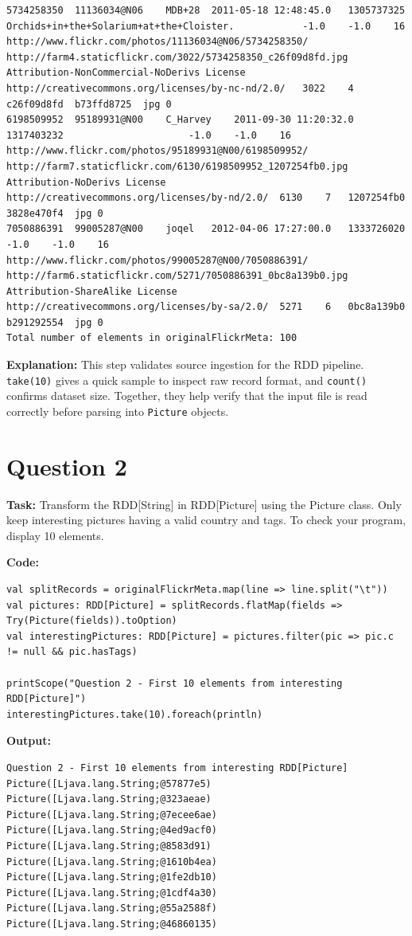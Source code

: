 \documentclass[11pt]{article}
\begin{document}
\begin{lstlisting}
5734258350	11136034@N06	MDB+28	2011-05-18 12:48:45.0	1305737325			Orchids+in+the+Solarium+at+the+Cloister.			-1.0	-1.0	16	http://www.flickr.com/photos/11136034@N06/5734258350/	http://farm4.staticflickr.com/3022/5734258350_c26f09d8fd.jpg	Attribution-NonCommercial-NoDerivs License	http://creativecommons.org/licenses/by-nc-nd/2.0/	3022	4	c26f09d8fd	b73ffd8725	jpg	0
6198509952	95189931@N00	C_Harvey	2011-09-30 11:20:32.0	1317403232						-1.0	-1.0	16	http://www.flickr.com/photos/95189931@N00/6198509952/	http://farm7.staticflickr.com/6130/6198509952_1207254fb0.jpg	Attribution-NoDerivs License	http://creativecommons.org/licenses/by-nd/2.0/	6130	7	1207254fb0	3828e470f4	jpg	0
7050886391	99005287@N00	joqel	2012-04-06 17:27:00.0	1333726020						-1.0	-1.0	16	http://www.flickr.com/photos/99005287@N00/7050886391/	http://farm6.staticflickr.com/5271/7050886391_0bc8a139b0.jpg	Attribution-ShareAlike License	http://creativecommons.org/licenses/by-sa/2.0/	5271	6	0bc8a139b0	b291292554	jpg	0
Total number of elements in originalFlickrMeta: 100
\end{lstlisting}

\textbf{Explanation:} This step validates source ingestion for the RDD pipeline. \texttt{take(10)} gives a quick sample to inspect raw record format, and \texttt{count()} confirms dataset size. Together, they help verify that the input file is read correctly before parsing into \texttt{Picture} objects.

\section*{Question 2}
\textbf{Task:} Transform the RDD[String] in RDD[Picture] using the Picture class. Only keep interesting pictures having a valid country and tags. To check your program, display 10 elements.

\textbf{Code:}
\begin{lstlisting}
val splitRecords = originalFlickrMeta.map(line => line.split("\t"))
val pictures: RDD[Picture] = splitRecords.flatMap(fields => Try(Picture(fields)).toOption)
val interestingPictures: RDD[Picture] = pictures.filter(pic => pic.c != null && pic.hasTags)

printScope("Question 2 - First 10 elements from interesting RDD[Picture]")
interestingPictures.take(10).foreach(println)
\end{lstlisting}

\textbf{Output:}
\begin{lstlisting}
Question 2 - First 10 elements from interesting RDD[Picture]
Picture([Ljava.lang.String;@57877e5)
Picture([Ljava.lang.String;@323aeae)
Picture([Ljava.lang.String;@7ecee6ae)
Picture([Ljava.lang.String;@4ed9acf0)
Picture([Ljava.lang.String;@8583d91)
Picture([Ljava.lang.String;@1610b4ea)
Picture([Ljava.lang.String;@1fe2db10)
Picture([Ljava.lang.String;@1cdf4a30)
Picture([Ljava.lang.String;@55a2588f)
Picture([Ljava.lang.String;@46860135)
\end{lstlisting}
\end{document}
